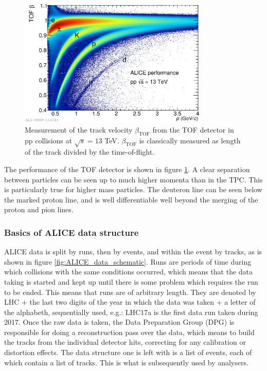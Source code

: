 \begin{figure}
    \centering
    \includegraphics[width=0.8\textwidth]{figures/2016-Sep-08-beta.pdf}
    \caption{Measurement of the track velocity $\beta_{\mathrm{TOF}}$ from the TOF detector in pp collisions at $\sqrt{s}=13$ TeV. $\beta_{\mathrm{TOF}}$ is classically measured as length of the track divided by the time-of-flight.}
    \label{fig:TOF_performance}
\end{figure}

The performance of the TOF detector is shown in figure \ref{fig:TOF_performance}. A clear separation between particles can be seen up to much higher momenta than in the TPC. This is particularly true for higher mass particles. The deuteron line can be seen below the marked proton line, and is well differentiable well beyond the merging of the proton and pion lines. 



\subsubsection{Basics of ALICE data structure}
ALICE data is split by runs, then by events, and within the event by tracks, as is shown in figure \ref{fig:ALICE_data_schematic}. Runs are periods of time during which collisions with the same conditions occurred, which means that the data taking is started and kept up until there is some problem which requires the run to be ended. This means that runs are of arbitrary length. They are denoted by LHC + the last two digits of the year in which the data was taken + a letter of the alphabeth, sequentially used, e.g.: LHC17a is the first data run taken during 2017. Once the raw data is taken, the Data Preparation Group (DPG) is responsible for doing a reconstruction pass over the data, which means to build the tracks from the individual detector hits, correcting for any calibration or distortion effects. The data structure  one is left with is a list of events, each of which contain a list of tracks. This is what is subsequently used by analysers. 

